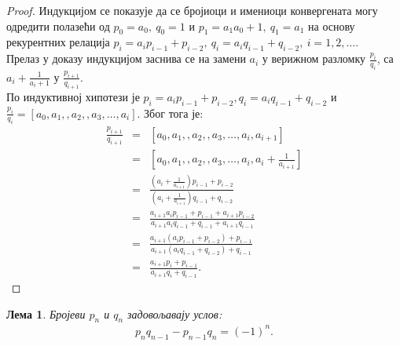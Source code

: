 \documentclass[a4paper]{article}
\newtheorem{lemma}{Лема}
\begin{document}
\begin{proof}	
	Индукцијом се показује да се бројиоци и имениоци конвергената могу одредити полазећи од $ p_{0} = a_{0},\  q_{0} = 1 $ и $ p_{1} = a_{1}a_{0} + 1,\ q_{1} = a_{1} $ на основу рекурентних релација $ p_{i} = a_{i}p_{i-1} + p_{i-2},\ q_{i} = a_{i}q_{i-1} + q_{i-2},\ i = 1, 2, \ldots $.\\
	Прелаз у доказу индукцијом заснива се на замени $ a_{i} $ у верижном разломку $ \frac{p_{i}}{q_{i}} $, са $ a_{i} + \frac{1}{a_{i} + 1} $
	у $ \frac{p_{i+1}}{q_{i+1}} $.\\
	По индуктивној хипотези је $ p_{i} = a_{i}p_{i-1} + p_{i-2}, q_{i} = a_{i}q_{i-1} + q_{i-2} $ и $ \frac{p_{i}}{q_{i}} = [a_{0}, a_{1}, , a_{2}, , a_{3}, \ldots, a_{i}] $. Због тога је:	
	\begin{eqnarray*}
		\frac{p_{i+1}}{q_{i+1}} &=& [a_{0}, a_{1}, , a_{2}, , a_{3}, \ldots, a_{i}, a_{i+1}]\\
		&=& [a_{0}, a_{1}, , a_{2}, , a_{3}, \ldots, a_{i}, a_{i} + \frac{1}{a_{i+1}}] \\
		&=& \frac{(a_{i} + \frac{1}{a_{i+1}})p_{i-1} + p_{i-2}}{(a_{i} + \frac{1}{a_{i+1}})q_{i-1} + q_{i-2}} \\
		&=& \frac{a_{i+1}a_{i}p_{i-1} + p_{i-1} + a_{i+1}p_{i-2}}{a_{i+1}a_{i}q_{i-1} + q_{i-1} + a_{i+1}q_{i-1}}\\
		&=& \frac{a_{i+1}(a_{i}p_{i-1} + p_{i-2}) + p_{i-1}}{a_{i+1}(a_{i}q_{i-1} + q_{i-2}) + q_{i-1}}\\
		&=& \frac{a_{i+1}p_{i} + p_{i-1}}{a_{i+1}q_{i} + q_{i-1}}. 
	\end{eqnarray*}
\end{proof}

\begin{lemma}
	\label{lemma:svojstva_p_q_1}
	Бројеви $ p_{n} $ и $ q_{n} $ задовољавају услов:	
	\begin{eqnarray}
		\label{c.f_svojstvo_1} p_{n}q_{n-1} - p_{n-1}q_{n} = (-1)^{n}.
	\end{eqnarray}	
\end{lemma}
\end{document}
